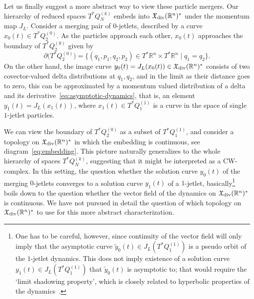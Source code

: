 \documentclass[12pt]{amsart}
\newcommand{\R}{\ensuremath{\mathbb{R}}}
\begin{document}
Let us finally suggest a more abstract way to view these particle
mergers. Our hierarchy of reduced spaces $T^*Q_N^{(k)}$ embeds into
$\mathfrak{X}_{\rm div}(\R^n)^*$ under the momentum map $J_L$.
Consider a merging pair of $0$-jetlets, described by a curve
$x_0(t) \in T^*Q_2^{(0)}$. As the particles approach each other,
$x_0(t)$ approaches the boundary of $T^*Q_2^{(0)}$ given by
\begin{equation}\label{eq:boundary}
  \partial\big( T^*Q_2^{(0)} \big)
  = \{ (q_1,p_1,q_2,p_2) \in T^* \R^n \times T^* \R^n \mid q_1 = q_2 \}.
\end{equation}
On the other hand, the image curve
$y_0(t) = J_L(x_0(t)) \in \mathfrak{X}_{\rm div}(\R^n)^*$ consists of
two covector-valued delta distributions at $q_1,q_2$, and in the limit
as their distance goes to zero, this can be approximated by a momentum
valued distribution of a delta and its
derivative~\eqref{eq:asymptotic-dynamics}, that is, an element
$y_1(t) = J_L(x_1(t))$, where $x_1(t) \in T^*Q_1^{(1)}$ is a curve in
the space of single $1$-jetlet particles.

We can view the boundary of $T^*Q_2^{(0)}$ as a subset of $T^*Q_1^{(1)}$,
and consider a topology on $\mathfrak{X}_{\rm div}(\mathbb{R}^n)^*$ in which
the embedding is continuous,
see diagram~\eqref{eq:embedding}.
This picture naturally generalizes to the whole hierarchy of spaces
$T^*Q_N^{(k)}$, suggesting that it might be interpreted as a
CW-complex. In this setting, the question whether the solution curve
$y_0(t)$ of the merging $0$-jetlets converges to a solution curve
$y_1(t)$ of a $1$-jetlet, basically\footnote{%
  One has to be careful, however, since continuity of the vector field will
  only imply that the asymptotic curve $\tilde{y}_0(t) \in J_L(T^*Q_1^{(1)})$
  is a pseudo orbit of the $1$-jetlet dynamics. This does not imply
  existence of a solution curve $y_1(t) \in J_L(T^*Q_1^{(1)})$ that
  $\tilde{y}_0(t)$ is asymptotic to; that would require the `limit
  shadowing property', which is closely related to hyperbolic
  properties of the dynamics~\cite{Ribeiro2014}.%
} boils down to the question whether the vector field of the dynamics
on $\mathfrak{X}_{\rm div}(\R^n)^*$ is continuous.
We have not pursued in detail the question of which topology on
$\mathfrak{X}_{\rm div}(\R^n)^*$ to use for this more abstract
characterization.

\end{document}
